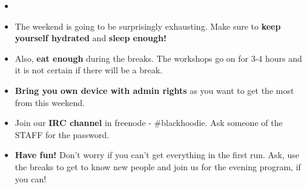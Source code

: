 \def\pagetitletext{Before The Bootcamp...}
{\large
\begin{changemargin}{1em}{3em}
\begin{itemize}
~\vspace{\fill}\\
\item{}
\item{The weekend is going to be surprisingly exhausting. Make sure to \textbf{keep yourself hydrated} and \textbf{sleep enough!}}
\vspace*{\fill}\\
\item{Also, \textbf{eat enough} during the breaks. The workshops go on for 3-4 hours and it is not certain if there will be a break.}
\vspace*{\fill}\\
\item{\textbf{Bring you own device with admin rights} as you want to get the most from this weekend.}
\vspace*{\fill}\\
\item{Join our \textbf{IRC channel} in freenode - \#blackhoodie. Ask someone of the STAFF for the password.}
\vspace*{\fill}\\
\item{\textbf{Have fun!} Don’t worry if you can't get everything in the first run. Ask, use the breaks to get to know new people and join us for the evening program, if you can!}
\vspace*{\fill}\\
\end{itemize}
\end{changemargin}
}
